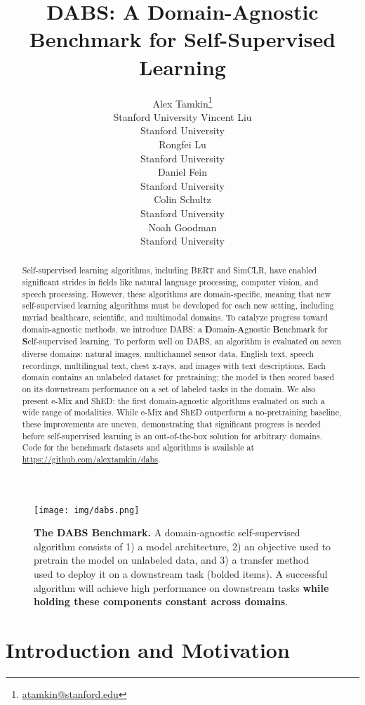 \documentclass{article}
\title{DABS: A Domain-Agnostic Benchmark for Self-Supervised Learning}
\author{Alex Tamkin\thanks{\url{atamkin@stanford.edu}} \\ Stanford University
   \And
   Vincent Liu \\ Stanford University \\
   \And
   Rongfei Lu \\ Stanford University \\
   \AND
   Daniel Fein \\ Stanford University \\
   \And
   Colin Schultz \\ Stanford University \\
   \And
   Noah Goodman \\ Stanford University \\
}
\begin{document}
\maketitle



\begin{abstract}
Self-supervised learning algorithms, including BERT and SimCLR, have enabled significant strides in fields like natural language processing, computer vision, and speech processing. However, these algorithms are domain-specific, meaning that new self-supervised learning algorithms must be developed for each new setting, including myriad healthcare, scientific, and multimodal domains. To catalyze progress toward domain-agnostic methods, we introduce DABS: a \textbf{D}omain-\textbf{A}gnostic \textbf{B}enchmark for \textbf{S}elf-supervised learning. To perform well on DABS, an algorithm is evaluated on seven diverse domains: natural images, multichannel sensor data, English text, speech recordings, multilingual text, chest x-rays, and images with text descriptions. Each domain contains an unlabeled dataset for pretraining; the model is then scored based on its downstream performance on a set of labeled tasks in the domain. We also present e-Mix and ShED: the first domain-agnostic algorithms evaluated on such a wide range of modalities. While e-Mix and ShED outperform a no-pretraining baseline, these improvements are uneven, demonstrating that significant progress is needed before self-supervised learning is an out-of-the-box solution for arbitrary domains. Code for the benchmark datasets and algorithms is available at \url{https://github.com/alextamkin/dabs}.
\end{abstract}

\begin{figure}[h!]
    \centering
    \texttt{[image: img/dabs.png]}
    \caption{\textbf{The DABS Benchmark.} A domain-agnostic self-supervised algorithm consists of 1) a model architecture, 2) an objective used to pretrain the model on unlabeled data, and 3) a transfer method used to deploy it on a downstream task (bolded items). A successful algorithm will achieve high performance on downstream tasks \textbf{while holding these components constant across domains}.}
    \label{fig:dabs}
\end{figure}

\section{Introduction and Motivation}
\label{sec:intro}
\end{document}
